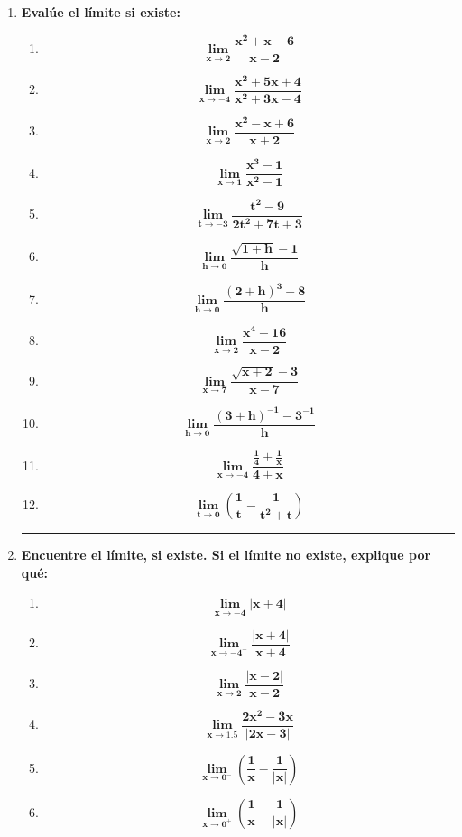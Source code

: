 \documentclass[12pt]{article}
\begin{document}
\begin{enumerate}[label=\textbf{\arabic*.}]
            
            \vspace{1cm}\hrule
            \item \textbf{Evalúe el límite si existe:}
                \begin{enumerate}[label=\textbf{\arabic*)}] 
                    \item \[\bm{\lim_{x \to 2} \frac{x ^2 + x - 6}{x - 2}}\]
                    \item \[\bm{\lim_{x \to -4} \frac{x ^2 + 5x +4}{x ^2 + 3x - 4}}\]
                    \item \[\bm{\lim_{x \to 2} \frac{x ^2 - x + 6}{x + 2}}\]
                    \item \[\bm{\lim_{x \to 1} \frac{x ^3 - 1}{x ^2 - 1}}\]
                    \item \[\bm{\lim_{t \to -3} \frac{t ^2 - 9}{2t ^2 + 7t + 3}}\]
                    \item \[\bm{\lim_{h \to 0} \frac{\sqrt{1 + h} - 1}{h}}\]
                    \item \[\bm{\lim_{h \to 0} \frac{(2 + h) ^3 - 8}{h}}\]
                    \item \[\bm{\lim_{x \to 2} \frac{x ^4 - 16}{x - 2}}\]
                    \item \[\bm{\lim_{x \to 7} \frac{\sqrt{x + 2} - 3}{x - 7}}\]
                    \item \[\bm{\lim_{h \to 0} \frac{(3 + h)^{-1} - 3^{-1}}{h}}\]
                    \item \[\bm{\lim_{x \to -4} \frac{\frac{1}{4} + \frac{1}{x}}{4 + x}}\]
                    \item \[\bm{\lim_{t \to 0} \left(\frac{1}{t} - \frac{1}{t ^2 + t}\right)}\]
                \end{enumerate}
            
            \vspace{1cm}\hrule
            \item \textbf{Encuentre el límite, si existe. Si el límite no existe, explique por qué:}
                \begin{enumerate}[label=\textbf{\arabic*)}] 
                    \item \[\bm{\lim_{x \to -4} \left| x + 4 \right|}\]
                    \item \[\bm{\lim_{x \to -4 ^-} \frac{\left| x + 4 \right|}{x + 4}}\]
                    \item \[\bm{\lim_{x \to 2} \frac{\left| x - 2 \right|}{x - 2}}\]
                    \item \[\bm{\lim_{x \to 1.5} \frac{2x ^2 - 3x}{\left| 2x - 3 \right|}}\]
                    \item \[\bm{\lim_{x \to 0 ^-} \left(\frac{1}{x} - \frac{1}{\left| x \right|}\right)}\]
                    \item \[\bm{\lim_{x \to 0 ^+} \left(\frac{1}{x} - \frac{1}{\left| x \right|}\right)}\]
                \end{enumerate}



\end{enumerate}
\end{document}
